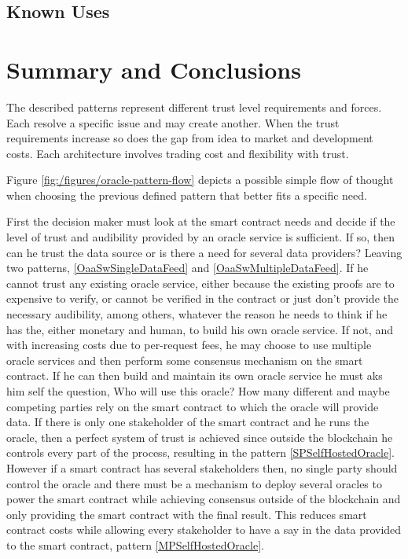 \subsection{Known Uses}


\section{Summary and Conclusions}
The described patterns represent different trust level requirements and forces. Each resolve a specific issue and may create another. When the trust requirements increase so does the gap from idea to market and development costs. Each architecture involves trading cost and flexibility with trust.

Figure \ref{fig:/figures/oracle-pattern-flow} depicts a possible simple flow of thought when choosing the previous defined pattern that better fits a specific need.

First the decision maker must look at the smart contract needs and decide if the level of trust and audibility provided by an oracle service is sufficient. If so, then can he trust the data source or is there a need for several data providers? Leaving two patterns, \ref{OaaSwSingleDataFeed} and \ref{OaaSwMultipleDataFeed}.
If he cannot trust any existing oracle service, either because the existing proofs are to expensive to verify, or cannot be verified in the contract or just don't provide the necessary audibility, among others, whatever the reason he needs to think if he has the, either monetary and human, to build his own oracle service. If not, and with increasing costs due to per-request fees, he may choose to use multiple oracle services and then perform some consensus mechanism on the smart contract. If he can then build and maintain its own oracle service he must aks him self the question, Who will use this oracle? How many different and maybe competing parties rely on the smart contract to which the oracle will provide data. If there is only one stakeholder of the smart contract and he runs the oracle, then a perfect system of trust is achieved since outside the blockchain he controls every part of the process, resulting in the pattern \ref{SPSelfHostedOracle}. However if a smart contract has several stakeholders then, no single party should control the oracle and there must be a mechanism to deploy several oracles to power the smart contract while achieving consensus outside of the blockchain and only providing the smart contract with the final result. This reduces smart contract costs while allowing every stakeholder to have a say in the data provided to the smart contract, pattern \ref{MPSelfHostedOracle}.

